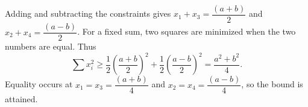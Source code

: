 Adding and subtracting the constraints gives $x_1+x_3=\dfrac{(a+b)}{2}$ and $x_2+x_4=\dfrac{(a-b)}{2}$. For a fixed sum, two squares are minimized when the two numbers are equal. Thus
\[
\sum x_i^2\ge\dfrac{1}{2}\left(\dfrac{a+b}{2}\right)^2+
\dfrac{1}{2}\left(\dfrac{a-b}{2}\right)^2
=\boxed{\dfrac{a^2+b^2}{4}}.
\]
Equality occurs at $x_1=x_3=\dfrac{(a+b)}{4}$ and $x_2=x_4=\dfrac{(a-b)}{4}$, so the bound is attained.
